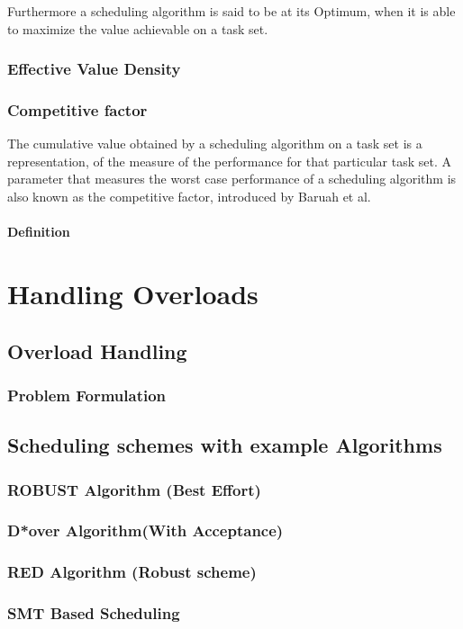 \documentclass[conference]{IEEEtran}
\begin{document}
Furthermore a scheduling algorithm is said to be at its Optimum, when it is able to maximize the value achievable on a task set. 
\subsubsection{Effective Value Density}
\subsubsection{Competitive factor}
The cumulative value obtained by a scheduling algorithm on a task set is a representation, of the measure of the performance for that particular task set. A parameter that measures the worst case performance of a scheduling algorithm is also known as the competitive factor, introduced by Baruah et al.\cite{185354}
\paragraph{Definition}

\section{Handling Overloads}
\subsection{Overload Handling}
\subsubsection{Problem Formulation}
\subsection{Scheduling schemes with example Algorithms}
\subsubsection{ROBUST Algorithm (Best Effort)}
\subsubsection{D*over Algorithm(With Acceptance)}
\subsubsection{RED Algorithm (Robust scheme)}
\subsubsection{SMT Based Scheduling}
\end{document}

